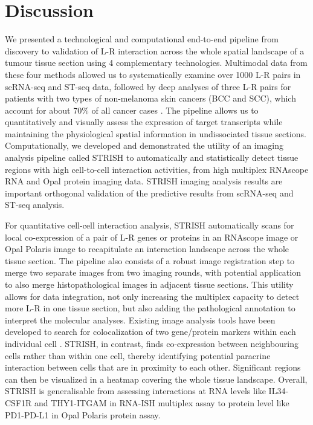 
\section{Discussion}
We presented a technological and computational end-to-end pipeline from discovery to validation of L-R interaction across the whole spatial landscape of a tumour tissue section using 4 complementary technologies. Multimodal data from these four methods allowed us to systematically examine over 1000 L-R pairs in scRNA-seq and ST-seq data, followed by deep analyses of three L-R pairs for patients with two types of non-melanoma skin cancers (BCC and SCC), which account for about 70\% of all cancer cases \cite{garcovich2017skin}. The pipeline allows us to quantitatively and visually assess the expression of target transcripts while maintaining the physiological spatial information in undissociated tissue sections. Computationally, we developed and demonstrated the utility of an imaging analysis pipeline called STRISH to automatically and statistically detect tissue regions with high cell-to-cell interaction activities, from high multiplex RNAscope RNA and Opal protein imaging data. STRISH imaging analysis results are important orthogonal validation of the predictive results from scRNA-seq and ST-seq analysis.  

For quantitative cell-cell interaction analysis, STRISH automatically scans for local co-expression of a pair of L-R genes or proteins in an RNAscope image or Opal Polaris image to recapitulate an interaction landscape across the whole tissue section. The pipeline also consists of a robust image registration step to merge two separate images from two imaging rounds, with potential application to also merge histopathological images in adjacent tissue sections. This utility allows for data integration, not only increasing the multiplex capacity to detect more L-R in one tissue section, but also adding the pathological annotation to interpret the molecular analyses. Existing image analysis tools have been developed to search for colocalization of two gene/protein markers within each individual cell \cite{bolte2006guided}. STRISH, in contrast, finds co-expression between neighbouring cells rather than within one cell, thereby identifying potential paracrine interaction between cells that are in proximity to each other. Significant regions can then be visualized in a heatmap covering the whole tissue landscape. Overall, STRISH is generalisable from assessing interactions at RNA levels like IL34-CSF1R and THY1-ITGAM in RNA-ISH multiplex assay to protein level like PD1-PD-L1 in Opal Polaris protein assay. 

